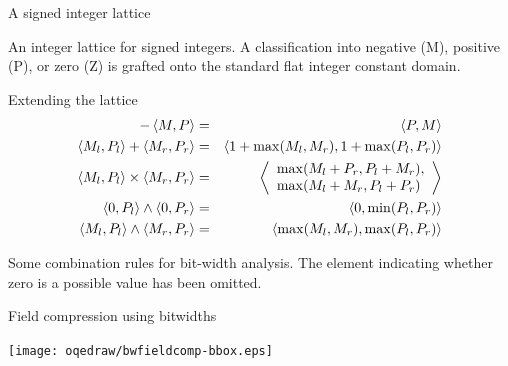 \documentclass[%
pdf,
colorBG,
slideColor,
nototal,
oqe
]{prosper}
\begin{document}
\begin{slide}{A signed integer lattice}
\begin{center}
\renewcommand{\figscale}{0.6}%
\newcommand{\color}[2][rgb]{}%

\end{center}

\small
An integer lattice for signed integers. A classification into
negative (M), positive (P), or zero (Z) is grafted onto the standard
flat integer constant domain.
\end{slide}

\begin{slide}{Extending the lattice}
\begin{eqnarray*}
-\left\langle M,P \right\rangle &=& \left\langle P,M \right\rangle\\
\left\langle M_l,P_l \right\rangle + \left\langle M_r,P_r \right\rangle &=& \left\langle 1+\max(M_l,M_r),1+\max(P_l,P_r) \right\rangle\\
\left\langle M_l,P_l \right\rangle \times \left\langle M_r,P_r \right\rangle &=&
\left\langle \begin{array}{l}\max(M_l+P_r,P_l+M_r),\\
                       \max(M_l+M_r,P_l+P_r)\end{array} \right\rangle\\
\left\langle 0,P_l \right\rangle \wedge \left\langle 0,P_r \right\rangle &=& \left\langle 0,\min(P_l,P_r) \right\rangle\\
\left\langle M_l,P_l \right\rangle\wedge \left\langle M_r,P_r \right\rangle &=& \left\langle \max(M_l,M_r),\max(P_l,P_r) \right\rangle
\end{eqnarray*}

Some combination rules for bit-width analysis.  The 
element indicating whether zero is a possible value has been omitted.
\end{slide}

\begin{slide}{Field compression using bitwidths}

\begin{center}
\vspace{1cm}
\texttt{[image: oqedraw/bwfieldcomp-bbox.eps]}
\end{center}
\end{slide}
\end{document}
